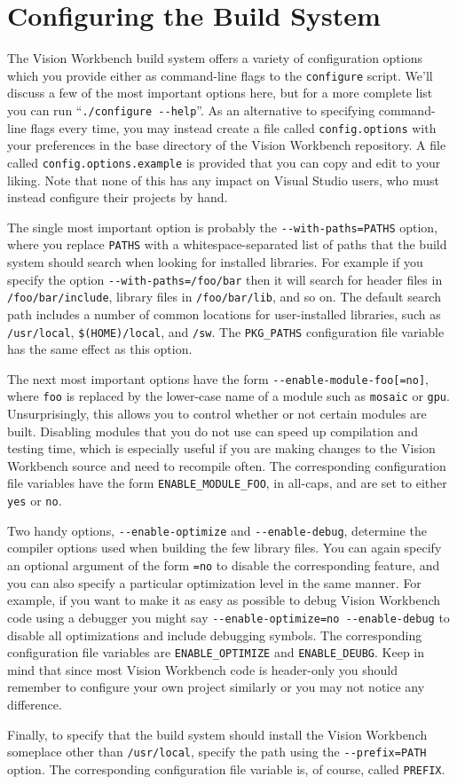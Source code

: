 \section{Configuring the Build System}\label{sec:config-build}

The Vision Workbench build system offers a variety of configuration
options which you provide either as command-line flags to the 
\verb#configure# script.  We'll discuss a few of the most important
options here, but for a more complete list you can run ``\verb#./configure --help#''.  
As an alternative to specifying command-line flags every time, you may
instead create a file called \verb#config.options# with your preferences 
in the base directory of the Vision Workbench repository.  A file
called \verb#config.options.example# is provided that you can copy and
edit to your liking.  Note that none of this has any impact on Visual
Studio users, who must instead configure their projects by hand.

The single most important option is probably the \verb#--with-paths=PATHS# 
option, where you replace \verb#PATHS# with a whitespace-separated list of 
paths that the build system should search when looking for installed 
libraries.  For example if you specify the option \verb#--with-paths=/foo/bar# 
then it will search for header files in \verb#/foo/bar/include#, library 
files in \verb#/foo/bar/lib#, and so on.  The default search path includes 
a number of common locations for user-installed libraries, such as 
\verb#/usr/local#, \verb#$(HOME)/local#, and \verb#/sw#.  The \verb#PKG_PATHS# 
configuration file variable has the same effect as this option.

The next most important options have the form \verb#--enable-module-foo[=no]#, 
where \verb#foo# is replaced by the lower-case name of a module such
as \verb#mosaic# or \verb#gpu#.  Unsurprisingly, this allows you to
control whether or not certain modules are built.  Disabling modules
that you do not use can speed up compilation and testing time, which
is especially useful if you are making changes to the Vision Workbench
source and need to recompile often.  The corresponding configuration
file variables have the form \verb#ENABLE_MODULE_FOO#, in all-caps,
and are set to either \verb#yes# or \verb#no#.

Two handy options, \verb#--enable-optimize# and \verb#--enable-debug#,
determine the compiler options used when building the few library
files.  You can again specify an optional argument of the form
\verb#=no# to disable the corresponding feature, and you can also
specify a particular optimization level in the same manner.  For
example, if you want to make it as easy as possible to debug Vision 
Workbench code using a debugger you might say 
\verb#--enable-optimize=no --enable-debug# 
to disable all optimizations and include debugging symbols.  The corresponding
configuration file variables are \verb#ENABLE_OPTIMIZE# and
\verb#ENABLE_DEUBG#.  Keep in mind that since most Vision Workbench
code is header-only you should remember to configure your own project
similarly or you may not notice any difference.

Finally, to specify that the build system should install the Vision Workbench 
someplace other than \verb#/usr/local#, specify the path using the 
\verb#--prefix=PATH# option.   The corresponding configuration file 
variable is, of course, called \verb#PREFIX#.
